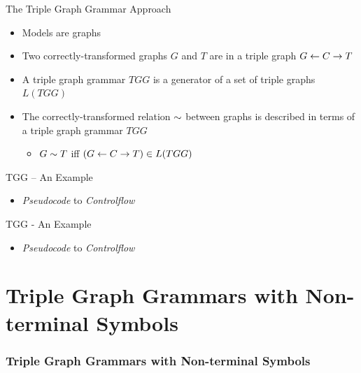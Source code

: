\documentclass[usenames,dvipsnames]{beamer}
\begin{document}
	\begin{frame}{The Triple Graph Grammar Approach}
		\begin{itemize}
			\item Models are graphs
			\pause
			\item Two correctly-transformed graphs $G$ and $T$ are in a triple graph $G \overset{}{\leftarrow} C \overset{}{\rightarrow} T$\\
			
			\pause
			\item A triple graph grammar $TGG$ is a generator of a set of triple graphs $L(TGG)$
			\pause
			\item The correctly-transformed relation $\sim$ between graphs is described in terms of a triple graph grammar $TGG$
			\begin{itemize}
				\item $G \sim T $ iff $(G \overset{}{\leftarrow} C \overset{}{\rightarrow} T) \in L(TGG)$
			\end{itemize}
		\end{itemize}
	\end{frame}
	
	\begin{frame}{TGG -- An Example}
		\begin{itemize}
			\item \emph{Pseudocode} to \emph{Controlflow}
		\end{itemize}
		
		
	\end{frame}
	
	\begin{frame}{TGG - An Example}
		\begin{itemize}
			\item \emph{Pseudocode} to \emph{Controlflow}
		\end{itemize}
			
		
	\end{frame}
	
	\section{Triple Graph Grammars with Non-terminal Symbols}
	\begin{frame}
		\frametitle{Triple Graph Grammars with Non-terminal Symbols}
	\end{frame}
	
\end{document}
